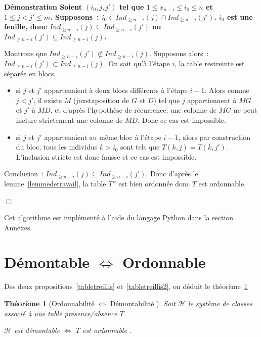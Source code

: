 \documentclass[a4paper]{report}
\renewcommand{\textbf}[1]{\begingroup\bfseries\mathversion{bold}#1\endgroup}
\newtheorem{theorem}{Théorème}[chapter]
\newenvironment{preuve}{\textbf{Démonstration}}{}
\begin{document}
\begin{preuve}
Soient $(i_0, j, j')$ tel que $1 \leqslant x_{n - i} \leqslant i_0 \leqslant n$ et $1 \leqslant j < j' \leqslant m $.
Supposons~: $i_0 \in Ind_{\geqslant n - i}(j) \cap Ind_{\geqslant n - i}(j')$.
$i_0$ est une feuille, donc $Ind_{\geqslant n - i}(j) \subseteq Ind_{\geqslant n - i}(j')$ ou 
$Ind_{\geqslant n - i}(j') \subseteq Ind_{\geqslant n - i}(j)$.

Montrons que $Ind_{\geqslant n - i}(j')  \not\subset Ind_{\geqslant n - i}(j)$.
Supposons alors~: $Ind_{\geqslant n - i}(j') \subset Ind_{\geqslant n - i}(j)$.
On sait qu'à l'étape $i$, la table restreinte est séparée en blocs.
\begin{itemize}
 \item si $j$ et $j'$ appartenaient à deux blocs différents à l'étape $i - 1$.
Alors comme $j < j'$, il existe $M$ (juxstaposition de $G$ et $D$) tel que $j$ appartiennent à $MG$ et $j'$ à $MD$, 
et d'après l'hypothèse de récurrence, une colonne de $MG$ ne peut inclure strictement une colonne de $MD$. 
Donc ce cas est impossible. 
 \item si $j$ et $j'$ appartenaient au m\^eme bloc à l'étape $i - 1$,
alors par construction du bloc, tous les individus $k > i_0$ sont tels que $T(k, j) = T(k, j')$.
L'inclusion stricte est donc fausse et ce cas est impossible.
\end{itemize}

Conclusion~: $Ind_{\geqslant n - i}(j) \subseteq Ind_{\geqslant n - i}(j')$. 
Donc d'après le lemme~\ref{lemmedetravail}, la table $T''$ est bien ordonnée donc $T$ est ordonnable. 

$\Box$
\end{preuve}

Cet algorithme est implémenté à l'aide du langage Python dans la section Annexes.
\section{Démontable $\Leftrightarrow$ Ordonnable}


Des deux propositions~\ref{tabletreillis} et~\ref{tabletreillis2}, on déduit le théorème~\ref{tabletreillistheo}

\begin{theorem}[Ordonnabilité $\Leftrightarrow$ Démontabilité ]

\label{tabletreillistheo}
Soit $\mathcal{H}$ le système de classes associé à une table présence/absence $T$.

$\mathcal{H}$ est démontable $\Leftrightarrow$ $T$ est ordonnable .  

\end{theorem}
\end{document}

